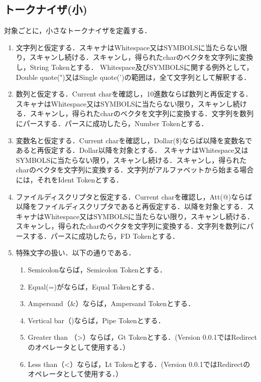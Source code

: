 \documentclass{article}
\begin{document}
\subsection{トークナイザ(小)}
対象ごとに，小さなトークナイザを定義する．
    \begin{enumerate}
        \item 文字列と仮定する．スキャナはWhitespace又はSYMBOLSに当たらない限り，スキャンし続ける．スキャンし，得られたcharのベクタを文字列に変換し，String Tokenとする．\newline
        Whitespace及びSYMBOLSに関する例外として，Double quote(")又はSingle quote(')の範囲は，全て文字列として解釈する．
        \item 数列と仮定する．Current charを確認し，10進数ならば数列と再仮定する．スキャナはWhitespace又はSYMBOLSに当たらない限り，スキャンし続ける．スキャンし，得られたcharのベクタを文字列に変換する．文字列を数列にパースする．パースに成功したら，Number Tokenとする．
        \item 変数名と仮定する．Current charを確認し，Dollar(\$)ならば以降を変数名であると再仮定する．Dollar以降を対象とする．
        スキャナはWhitespace又はSYMBOLSに当たらない限り，スキャンし続ける．スキャンし，得られたcharのベクタを文字列に変換する．文字列がアルファベットから始まる場合には，それをIdent Tokenとする．
        \item ファイルディスクリプタと仮定する．Current charを確認し，Att(@)ならば以降をファイルディスクリプタであると再仮定する．以降を対象とする．スキャナはWhitespace又はSYMBOLSに当たらない限り，スキャンし続ける．スキャンし，得られたcharのベクタを文字列に変換する．文字列を数列にパースする．パースに成功したら，FD Tokenとする．
        \item 特殊文字の扱い．以下の通りである．
            \begin{enumerate}
                \item Semicolonならば，Semicolon Tokenとする．
                \item Equal(=)がならば，Equal Tokenとする．
                \item Ampersand（\&）ならば，Ampersand Tokenとする．
                \item Vertical bar（\textbar)ならば，Pipe Tokenとする．
                \item Greater than （\textgreater）ならば，Gt Tokenとする．(Version 0.0.1ではRedirectのオペレータとして使用する．）
                \item Less than（\textless）ならば，Lt Tokenとする．(Version 0.0.1ではRedirectのオペレータとして使用する．）

\end{enumerate}
\end{enumerate}
\end{document}
